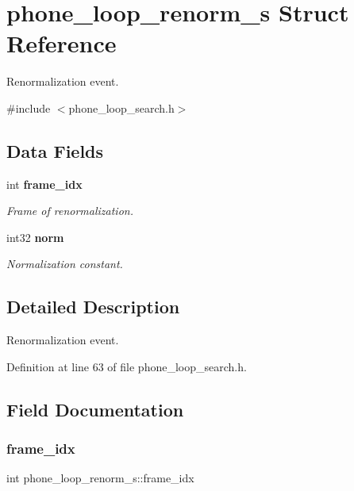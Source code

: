 \section{phone\+\_\+loop\+\_\+renorm\+\_\+s Struct Reference}
\label{structphone__loop__renorm__s}


Renormalization event.  




{\ttfamily \#include $<$phone\+\_\+loop\+\_\+search.\+h$>$}

\subsection*{Data Fields}
\begin{DoxyCompactItemize}
\item 
int \textbf{ frame\+\_\+idx}
\begin{DoxyCompactList}\small\item\em Frame of renormalization. \end{DoxyCompactList}\item 
int32 \textbf{ norm}
\begin{DoxyCompactList}\small\item\em Normalization constant. \end{DoxyCompactList}\end{DoxyCompactItemize}


\subsection{Detailed Description}
Renormalization event. 

Definition at line 63 of file phone\+\_\+loop\+\_\+search.\+h.



\subsection{Field Documentation}
\mbox{\label{structphone__loop__renorm__s_af54c31c6d417b769b088b898294a135e}} 
\subsubsection{frame\+\_\+idx}
{\footnotesize\ttfamily int phone\+\_\+loop\+\_\+renorm\+\_\+s\+::frame\+\_\+idx}



